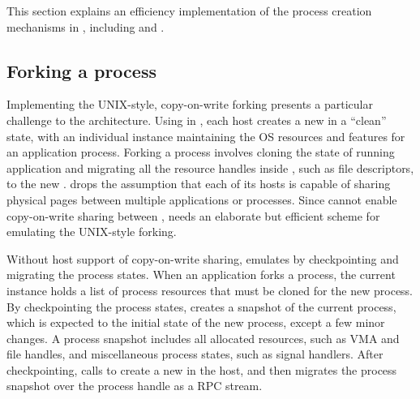 This section explains an efficiency implementation of the process creation mechanisms in \thelibos{},
including  and .




\subsection{Forking a process}



Implementing the UNIX-style, copy-on-write forking presents a particular challenge to the \graphene{} architecture.
Using  in \thehostabi{}, each \graphene{} host
creates a new \picoproc{} in a ``clean'' state, with an individual \thelibos{} instance maintaining the OS resources and features for an application process. %
Forking a process involves cloning the state of running application and migrating all the resource handles inside \thelibos{}, such as file descriptors, to the new \picoproc{}.
\graphene{} drops the assumption that each of its hosts is capable of sharing physical pages between multiple applications or processes.
Since \thelibos{} cannot enable copy-on-write sharing between \picoprocs{}, \thelibos{} needs an elaborate but efficient scheme for emulating the UNIX-style forking.


Without host support of copy-on-write sharing,
\thelibos{} emulates  by checkpointing and migrating the process states.
When an application forks a process,
the current \thelibos{} instance holds a list of process resources that must be cloned for the new process.
By checkpointing the process states,
\thelibos{} creates a snapshot of the current process,
which is expected to the initial state
of the new process,
except a few minor changes.
A process snapshot includes all allocated resources, such as VMA and file handles,
and miscellaneous process states, such as signal handlers.
After checkpointing,
\thelibos{} calls  to create a new \picoproc{} in the host, and then migrates the process snapshot over the process handle as a RPC stream. %


